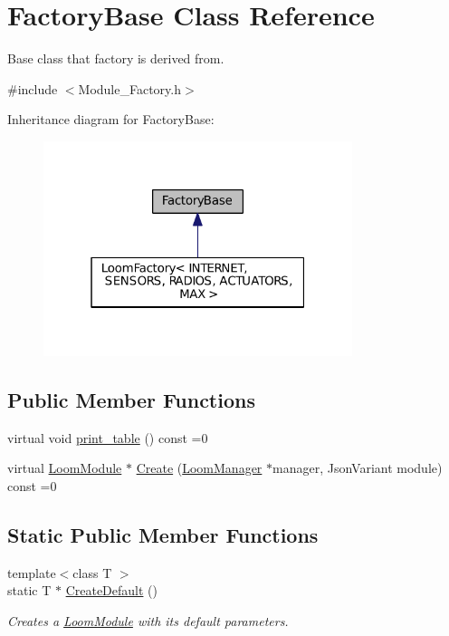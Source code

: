 \hypertarget{class_factory_base}{}\section{Factory\+Base Class Reference}
\label{class_factory_base}


Base class that factory is derived from.  




{\ttfamily \#include $<$Module\+\_\+\+Factory.\+h$>$}



Inheritance diagram for Factory\+Base\+:\nopagebreak
\begin{figure}[H]
\begin{center}
\leavevmode
\includegraphics[width=256pt]{class_factory_base__inherit__graph}
\end{center}
\end{figure}
\subsection*{Public Member Functions}
\begin{DoxyCompactItemize}
\item 
virtual void \hyperlink{class_factory_base_a96c50a015c8e2b0e6cc4a8ee48ae2a12}{print\+\_\+table} () const =0
\item 
virtual \hyperlink{class_loom_module}{Loom\+Module} $\ast$ \hyperlink{class_factory_base_a1a3356d8729b56634c3bca85c7530223}{Create} (\hyperlink{class_loom_manager}{Loom\+Manager} $\ast$manager, Json\+Variant module) const =0
\end{DoxyCompactItemize}
\subsection*{Static Public Member Functions}
\begin{DoxyCompactItemize}
\item 
{\footnotesize template$<$class T $>$ }\\static T $\ast$ \hyperlink{class_factory_base_a4d5751e4e588002b1f5390124bfc1351}{Create\+Default} ()
\begin{DoxyCompactList}\small\item\em Creates a \hyperlink{class_loom_module}{Loom\+Module} with its default parameters. \end{DoxyCompactList}\end{DoxyCompactItemize}


